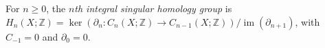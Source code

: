 
For $n\ge0$, the \emph{$n$th integral singular homology group} is $H_n(X;\mathbb Z)=\ker(\partial_n:C_n(X;\mathbb Z)\to C_{n-1}(X;\mathbb Z))/\operatorname{im}(\partial_{n+1})$, with $C_{-1}=0$ and $\partial_0=0$.
